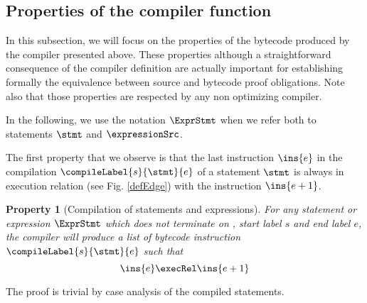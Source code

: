 
\newtheorem{compProp0}{Property}[subsection]
\newtheorem{compProp1}[compProp0]{Property} %
\newtheorem{compProp2}[compProp0]{Property} %
\newtheorem{compProp11}[compProp0]{Property}
\newtheorem{compProp6}[compProp0]{Property} %
\newtheorem{compProp3}[compProp0]{Property} %
\newtheorem{compProp7}[compProp0]{Property} %

\newtheorem{compProp8}[compProp0]{Property} %
\newtheorem{compProp9}[compProp0]{Property}
\newtheorem{compProp10}[compProp0]{Property}
\newtheorem{compProp4}[compProp0]{Property} %
\newtheorem{compProp5}[compProp0]{Property} %
\newtheorem{seqInstr}{Definition}[subsection]




 
\newcommand{\isStartExc}[1]{\mbox{\rm\textit{isExcHandlerStart}}(#1)}
\subsection{Properties of the compiler function}\label{compile:prop}

In this subsection, we will focus on the properties of the  bytecode produced by the compiler presented above.
These properties although a straightforward consequence of the compiler definition
 are actually important for establishing formally the equivalence between source and bytecode 
proof obligations. Note also that those properties are respected by any non optimizing compiler.


In the following, we use the notation $\ExprStmt$ when we refer both to statements $\stmt$ and $\expressionSrc$.
 
The first property that we observe is that the last instruction $\ins{e}$ in the compilation
 $\compileLabel{s}{\stmt}{e}$  of a statement $\stmt$ is always in execution relation (see Fig. \ref{defEdge}) with the
  instruction $\ins{e + 1}$.

\begin{compProp0}[Compilation of statements and expressions]\label{compile:prop:compProp0}
 For any statement or expression $\ExprStmt$ which does not terminate on \return, start label $s$ and end label $e$,
    the compiler will produce a list of bytecode instruction $\compileLabel{s}{\stmt}{e}$ such that 
     $$ \ins{e} \execRel \ins{e+1}$$
\end{compProp0}
The proof is trivial by case analysis of the compiled statements.

